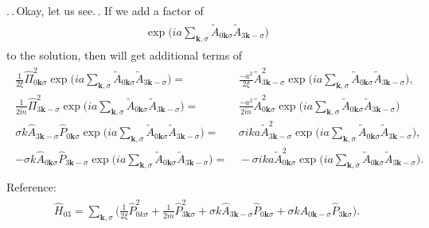 \documentclass{report}
\begin{document}
.\,.\,Okay, let us see.\,. If we add a factor of %
\begin{align}
\begin{aligned}
	\exp\Big(
		i a \sum_{\boldsymbol{k}, \sigma} %
		\tilde A_{0\boldsymbol{k}\sigma} 
		\tilde A_{3\boldsymbol{k}-\sigma} 
	\Big)
\end{aligned}
\end{align}
to the solution, then will get additional terms of
\begin{align}
\begin{aligned}
	\frac{1}{2\xi} \hat \Pi_{0\boldsymbol{k}\sigma}^2 
	\exp\Big(
		i a \sum_{\boldsymbol{k}, \sigma} %
		\tilde A_{0\boldsymbol{k}\sigma} 
		\tilde A_{3\boldsymbol{k}-\sigma} 
	\Big) =&\,
	\frac{-a^2}{2\xi} \tilde A_{3\boldsymbol{k}-\sigma}^2 
	\exp\Big(
		i a \sum_{\boldsymbol{k}, \sigma} %
		\tilde A_{0\boldsymbol{k}\sigma} 
		\tilde A_{3\boldsymbol{k}-\sigma} 
	\Big), \\
	\frac{1}{2\tilde m} \hat \Pi_{3\boldsymbol{k}-\sigma}^2 
	\exp\Big(
		i a \sum_{\boldsymbol{k}, \sigma} %
		\tilde A_{0\boldsymbol{k}\sigma} 
		\tilde A_{3\boldsymbol{k}-\sigma} 
	\Big) =&\,
	\frac{-a^2}{2\tilde m} \tilde A_{0\boldsymbol{k}\sigma}^2 
	\exp\Big(
		i a \sum_{\boldsymbol{k}, \sigma} %
		\tilde A_{0\boldsymbol{k}\sigma} 
		\tilde A_{3\boldsymbol{k}-\sigma} 
	\Big) \\
	\sigma k \hat{A}_{3 \boldsymbol k -\sigma} \hat P_{0 \boldsymbol k \sigma} 
	\exp\Big(
		i a \sum_{\boldsymbol{k}, \sigma} %
		\tilde A_{0\boldsymbol{k}\sigma} 
		\tilde A_{3\boldsymbol{k}-\sigma} 
	\Big) =&\,
	\sigma i k a \tilde A_{3\boldsymbol{k}-\sigma}^2 
	\exp\Big(
		i a \sum_{\boldsymbol{k}, \sigma} %
		\tilde A_{0\boldsymbol{k}\sigma} 
		\tilde A_{3\boldsymbol{k}-\sigma} 
	\Big), \\
	-\sigma k \hat{A}_{0 \boldsymbol k \sigma} \hat P_{3 \boldsymbol k -\sigma} 
	\exp\Big(
		i a \sum_{\boldsymbol{k}, \sigma} %
		\tilde A_{0\boldsymbol{k}\sigma} 
		\tilde A_{3\boldsymbol{k}-\sigma} 
	\Big) =&\,
	-\sigma i k a \tilde A_{0\boldsymbol{k}\sigma}^2 
	\exp\Big(
		i a \sum_{\boldsymbol{k}, \sigma} %
		\tilde A_{0\boldsymbol{k}\sigma} 
		\tilde A_{3\boldsymbol{k}-\sigma} 
	\Big). \\
\end{aligned}
\end{align}
Reference:
\begin{align}
\begin{aligned}
	\hat H_{03} = 
		\sum_{\boldsymbol k, \sigma}\Big(
			\frac{1}{2\xi} \hat P^2_{0 k \sigma} +
			\frac{1}{2m} \hat P^2_{3 \boldsymbol k \sigma} +
			\sigma k \hat{A}_{3 \boldsymbol k -\sigma} \hat P_{0 \boldsymbol k \sigma} + 
			\sigma k \hat{A}_{0 \boldsymbol k -\sigma} \hat P_{3 \boldsymbol k \sigma} 
		\Big).
\end{aligned}
\end{align}
\end{document}
